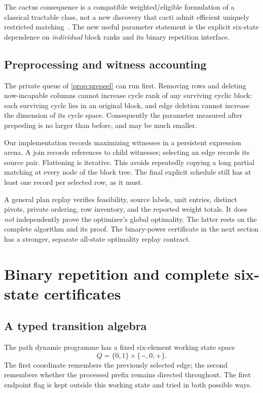 \documentclass[11pt,letterpaper]{article}
\theoremstyle{definition}
\theoremstyle{remark}
\begin{document}
The cactus consequence is a compatible weighted/eligible formulation of a classical tractable class, not a new discovery that cacti admit efficient uniquely restricted matching~\cite{ghl}. The new useful parameter statement is the explicit six-state dependence on \emph{individual} block ranks and its binary repetition interface.

\subsection{Preprocessing and witness accounting}
The private queue of \cref{prop:prepeel} can run first. Removing rows and deleting now-incapable columns cannot increase cycle rank of any surviving cyclic block: each surviving cycle lies in an original block, and edge deletion cannot increase the dimension of its cycle space. Consequently the parameter measured after prepeeling is no larger than before, and may be much smaller.

Our implementation records maximizing witnesses in a persistent expression arena. A join records references to child witnesses; selecting an edge records its source pair. Flattening is iterative. This avoids repeatedly copying a long partial matching at every node of the block tree. The final explicit schedule still has at least one record per selected row, as it must.

A general plan replay verifies feasibility, source labels, unit entries, distinct pivots, private ordering, row inventory, and the reported weight totals. It does \emph{not} independently prove the optimizer's global optimality. The latter rests on the complete algorithm and its proof. The binary-power certificate in the next section has a stronger, separate all-state optimality replay contract.

\section{Binary repetition and complete six-state certificates}
\label{sec:powers}

\subsection{A typed transition algebra}
The path dynamic programme has a fixed six-element working state space
\[
 Q=\{0,1\}\times\{-,0,+\}.
\]
The first coordinate remembers the previously selected edge; the second remembers whether the processed prefix remains directed throughout. The first endpoint flag is kept outside this working state and tried in both possible ways.
\end{document}
